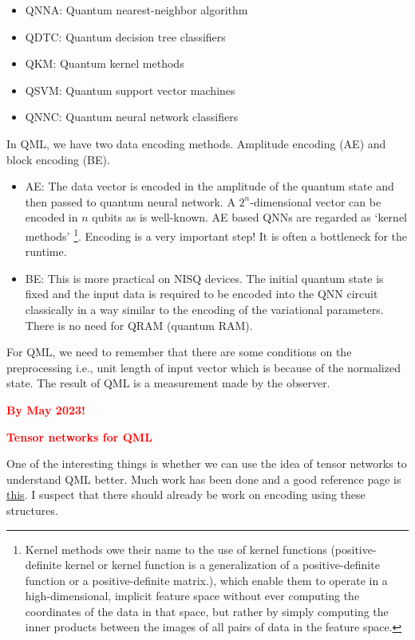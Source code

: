 \documentclass[11pt]{article}
\newcommand{\TODO}[1]{\textcolor{red}{\textbf{#1}}}
\begin{document}
\begin{itemize}
\item QNNA: Quantum nearest-neighbor algorithm 
\item QDTC: Quantum decision tree classifiers
\item QKM: Quantum kernel methods
\item QSVM: Quantum support vector machines
\item QNNC: Quantum neural network classifiers
\end{itemize}

In QML, we have two data encoding methods. Amplitude encoding (AE) and block encoding (BE). 

\begin{itemize}
\item AE: The data vector is encoded in the amplitude of the quantum state and then passed to quantum neural network. 
A $2^{n}$-dimensional vector can be encoded in $n$ qubits as is well-known. AE based QNNs are regarded as 
`kernel methods' \footnote{Kernel methods owe their name to the use of kernel functions (positive-definite kernel or kernel function is a generalization of a positive-definite function or a positive-definite matrix.), 
which enable them to operate in a high-dimensional, implicit feature space without ever computing the coordinates of the data in that space, but rather by simply computing the inner products between the images of all pairs of data in the feature space.}. Encoding is a very important step! It is often a bottleneck for the runtime. 
\item BE: This is more practical on NISQ devices. The initial quantum state is fixed and 
the input data is required to be encoded into the QNN circuit classically in a way similar to the encoding of the variational parameters.
There is no need for QRAM (quantum RAM). 
\end{itemize}

For QML, we need to remember that there are some conditions on the 
preprocessing i.e., unit length of input vector which is because of the normalized state. 
The result of QML is a measurement made by the observer. 



\TODO{By May 2023!} 

\TODO{Tensor networks for QML}

One of the interesting things is whether we can use the idea of tensor networks 
to understand QML better. Much work has been done and a good reference page is 
\href{https://tensornetwork.org/ml/}{this}. I suspect that there should already be work on encoding using these structures. 



\appendix  
	
	\newpage
	
	
\end{document}
